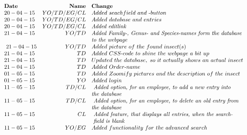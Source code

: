 \documentclass[12pt,a4paper]{article}
\begin{document}
	$$
	\begin{array}{lrl}
		\bf{Date} & \bf{Name} & \bf{Change} \\ 
		20-04-15 & YO/TD/EG/CL & Added~seachfield~and~\text{-}button \\
		20-04-15 & YO/TD/EG/CL & Added~database~and~entries \\
		20-04-15 & YO/TD/EG/CL & \vtop{\hbox{\strut \emph{Added~edit\-link}}} \\
		21-04-15 & YO/TD & \vtop{\hbox{\strut \emph{Added~Family\text{-},~Genus\text{-}~and~Species\text{-}names~form~the~database}}\hbox{\strut \emph{to~the~webpage}}} ~\\~
		21-04-15 & YO/TD & Added~picture~of~the~found~insect(s) \\
		21-04-15 & TD & Added~CSS\text{-}code~to~shine~the~webpage~a~bit~up \\
		21-04-15 & TD & Updated~the~database,~so~it~actually~shows~an~actual~insect\\
		21-04-15 & TD & Added~Order\text{-}name\\
		01-05-15 & TD & Added~Zoomify~pictures~and~the~description~of~the~insect\\
		01-05-15 & YO & Added~login\\
		11-05-15 & TD/CL & \vtop{\hbox{\strut \emph{	Added~option,~for~an~employee,~to~add~a~new~entry~into~}}\hbox{\strut \emph{the~database}}} \\
		11-05-15 & TD/CL & \vtop{\hbox{\strut \emph{	Added~option,~for~an~employee,~to~delete~an~old~entry~from}}\hbox{\strut \emph{the~database}}} \\
		11-05-15 & CL & \vtop{\hbox{\strut \emph{	Added~feature,~that~displays~all~entries,~when~the~search\text{-}}}\hbox{\strut \emph{~field~is~blank}}}\\
		11-05-15 & YO/EG & Added~functionality~for~the~advanced~search\\

	\end{array}
	$$
\end{document}

